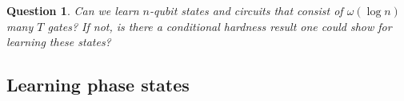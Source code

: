 \documentclass[11pt]{article}
\def\01{\{0,1\}}
\def\01{\{0,1\}}
\newcommand{\ket}[1]{|#1\rangle}
\newcommand{\ZZ}{\mathbb{Z}}
\newtheorem{question}{Question}
\begin{document}
    \begin{question}
    Can we learn $n$-qubit states and circuits that consist of $\omega(\log n)$ many $T$ gates? If not, is there a conditional hardness result one could show for learning these states?
\end{question}


\subsection{Learning phase states}

\end{document}
